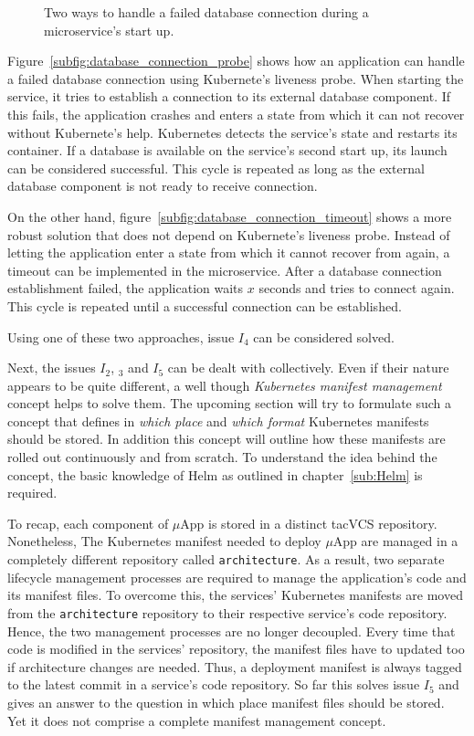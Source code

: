 \begin{figure}[H]
{  }
  \hspace*{\fill}%

  \caption{Two ways to handle a failed database connection during a microservice's start up.}%
  \label{fig:database_connection_start_up}
\end{figure}

Figure~\ref{subfig:database_connection_probe} shows how an application can
handle a failed database connection using Kubernete's liveness probe. When
starting the service, it tries to establish a connection to its external
database component. If this fails, the application crashes and enters a state
from which it can not recover without Kubernete's help. Kubernetes detects the
service's state and restarts its container. If a database is available on the
service's second start up, its launch can be considered successful. This cycle
is repeated as long as the external database component is not ready to receive
connection.

On the other hand, figure~\ref{subfig:database_connection_timeout} shows a more
robust solution that does not depend on Kubernete's liveness probe. Instead of
letting the application enter a state from which it cannot recover from again,
a timeout can be implemented in the microservice. After a database connection
establishment failed, the application waits $x$ seconds and tries to connect
again. This cycle is repeated until a successful connection can be established.

Using one of these two approaches, issue $I_4$ can be considered solved.

Next, the issues $I_2$, $_3$ and $I_5$ can be dealt with collectively. Even if
their nature appears to be quite different, a well though \textit{Kubernetes
manifest management} concept helps to solve them. The upcoming section will try
to formulate such a concept that defines in \textit{which place} and
\textit{which format} Kubernetes manifests should be stored. In addition this
concept will outline how these manifests are rolled out continuously and from
scratch. To understand the idea behind the concept, the basic knowledge of Helm
as outlined in chapter~\ref{sub:Helm} is required.

To recap, each component of $\mu$App is stored in a distinct tac{VCS}
repository. Nonetheless, The Kubernetes manifest needed to deploy $\mu$App are
managed in a completely different repository called \texttt{architecture}. As a
result, two separate lifecycle management processes are required to manage the
application's code and its manifest files. To overcome this, the services'
Kubernetes manifests are moved from the \texttt{architecture} repository to
their respective service's code repository. Hence, the two management processes
are no longer decoupled. Every time that code is modified in the services'
repository, the manifest files have to updated too if architecture changes are
needed. Thus, a deployment manifest is always tagged to the latest commit in a
service's code repository. So far this solves issue $I_5$ and gives an answer
to the question in which place manifest files should be stored. Yet it does not
comprise a complete manifest management concept.

